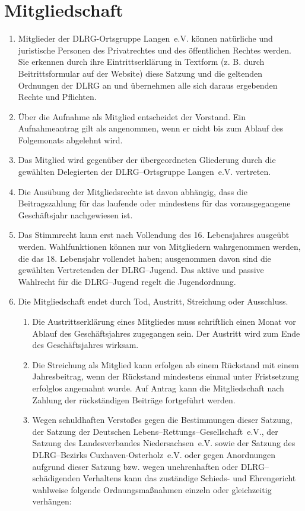 \documentclass[%
12pt, %
a4paper, %
headsepline, %
parskip, %
headings=normal, %
]{scrreprt}
\begin{document}
\section{Mitgliedschaft}
\label{sec:mitgliedschaft}
\begin{enumerate}
    \item Mitglieder der DLRG-Ortsgruppe Langen~e.V. können natürliche und juristische Personen des Privatrechtes und des öffentlichen Rechtes werden. Sie erkennen durch ihre Eintrittserklärung in Textform (z. B. durch Beitrittsformular auf der Website) diese Satzung und die geltenden Ordnungen der DLRG an und übernehmen alle sich daraus ergebenden Rechte und Pflichten.
    \item Über die Aufnahme als Mitglied entscheidet der Vorstand. Ein Aufnahmeantrag gilt als angenommen, wenn er nicht bis zum Ablauf des Folgemonats abgelehnt wird.
    \item Das Mitglied wird gegenüber der übergeordneten Gliederung durch die gewählten Delegierten der DLRG--Ortsgruppe Langen~e.V. vertreten.
    \item Die Ausübung der Mitgliedsrechte ist davon abhängig, dass die Beitragszahlung für das laufende oder mindestens für das vorausgegangene Geschäftsjahr nachgewiesen ist.
    \item Das Stimmrecht kann erst nach Vollendung des 16. Lebensjahres ausgeübt werden. Wahlfunktionen können nur von Mitgliedern wahrgenommen werden, die das 18. Lebensjahr vollendet haben; ausgenommen davon sind die gewählten Vertretenden der DLRG--Jugend. Das aktive und passive Wahlrecht für die DLRG--Jugend regelt die Jugendordnung.
    \item Die Mitgliedschaft endet durch Tod, Austritt, Streichung oder Ausschluss.\begin{enumerate}[noitemsep]
        \item Die Austrittserklärung eines Mitgliedes muss schriftlich einen Monat vor Ablauf des Geschäftsjahres zugegangen sein. Der Austritt wird zum Ende des Geschäftsjahres wirksam.
        \item Die Streichung als Mitglied kann erfolgen ab einem Rückstand mit einem Jahresbeitrag, wenn der Rückstand mindestens einmal unter Fristsetzung erfolglos angemahnt wurde. Auf Antrag kann die Mitgliedschaft nach Zahlung der rückständigen Beiträge fortgeführt werden.
        \item Wegen schuldhaften Verstoßes gegen die Bestimmungen dieser Satzung, der Satzung der Deutschen Lebens--Rettungs--Gesellschaft~e.V., der Satzung des Landesverbandes Niedersachsen~e.V. sowie der Satzung des DLRG--Bezirks Cuxhaven-Osterholz~e.V. oder gegen Anordnungen aufgrund dieser Satzung bzw. wegen unehrenhaften oder DLRG--schädigenden Verhaltens kann das zuständige Schieds- und Ehrengericht wahlweise folgende Ordnungsmaßnahmen einzeln oder gleichzeitig verhängen:\begin{enumerate}

\end{enumerate}
\end{enumerate}
\end{enumerate}
\end{document}
